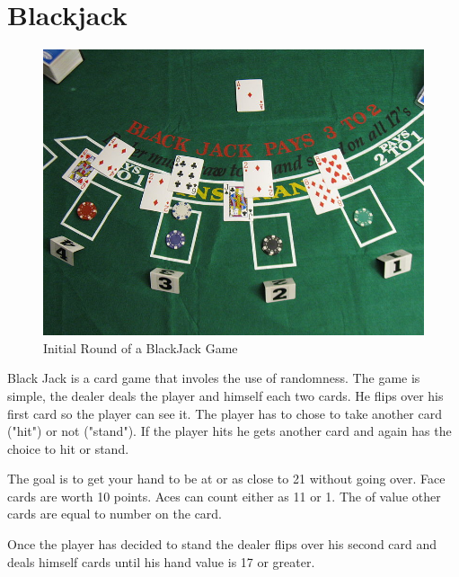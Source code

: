 \label{Ch:BJ}


\section*{Blackjack}


\begin{figure}[H]
\includegraphics[scale = .9]{Blackjack_game_1.jpg}
\caption{Initial Round of a BlackJack Game}
\end{figure}

Black Jack is a card game that involes the use of randomness. The game is simple, the dealer deals the player and himself each two cards. He flips over his first card so the player can see it. The player has to chose to take another card ("hit") or not ("stand"). If the player hits he gets another card and again has the choice to hit or stand.

The goal is to get your hand to be at or as close to 21 without going over. Face cards are worth 10 points. Aces can count either as 11 or 1. The of value other cards are equal to number on the card.

Once the player has decided to stand the dealer flips over his second card and deals himself cards until his hand value is 17 or greater. 

